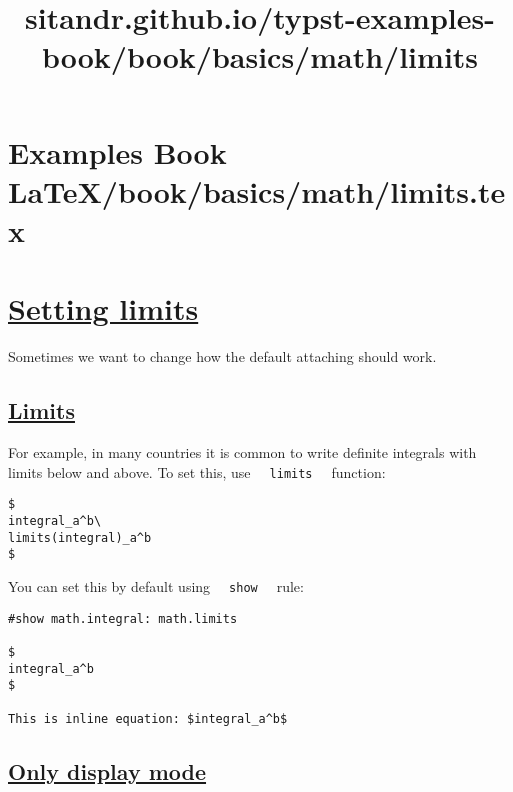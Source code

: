 \pandocbounded{}


\section{Examples Book LaTeX/book/basics/math/limits.tex}
\title{sitandr.github.io/typst-examples-book/book/basics/math/limits}

\section{\texorpdfstring{\hyperref[setting-limits]{Setting
limits}}{Setting limits}}\label{setting-limits}

Sometimes we want to change how the default attaching should work.

\subsection{\texorpdfstring{\hyperref[limits]{Limits}}{Limits}}\label{limits}

For example, in many countries it is common to write definite integrals
with limits below and above. To set this, use
\texttt{\ }{\texttt{\ limits\ }}\texttt{\ } function:

\begin{verbatim}
$
integral_a^b\
limits(integral)_a^b
$
\end{verbatim}

\pandocbounded{}

You can set this by default using
\texttt{\ }{\texttt{\ show\ }}\texttt{\ } rule:

\begin{verbatim}
#show math.integral: math.limits

$
integral_a^b
$

This is inline equation: $integral_a^b$
\end{verbatim}

\pandocbounded{}

\subsection{\texorpdfstring{\hyperref[only-display-mode]{Only display
mode}}{Only display mode}}\label{only-display-mode}


